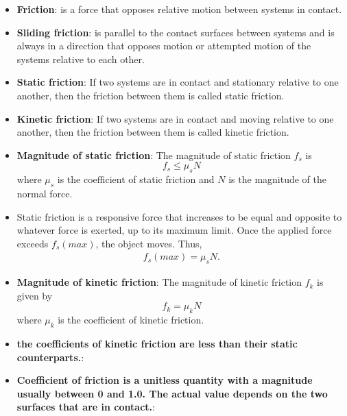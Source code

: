 \documentclass{report}
\begin{document}
\begin{itemize}
\begin{itemize}
                \end{itemize}
                \item \textbf{Friction}: is a force that opposes relative motion between systems in contact.
                \item \textbf{Sliding friction}: is parallel to the contact surfaces between systems and is always in a direction that opposes motion or attempted motion of the systems relative to each other. 
                \item \textbf{Static friction}: If two systems are in contact and stationary relative to one another, then the friction between them is called static friction. 
                \item \textbf{Kinetic friction}: If two systems are in contact and moving relative to one another, then the friction between them is called kinetic friction.
                \item \textbf{Magnitude of static friction}:
                    The magnitude of static friction $f_s$ is
                    \begin{equation}
                        f_s \leq \mu_s N
                    \end{equation}
                    where $\mu_s$ is the coefficient of static friction and $N$ is the magnitude of the normal force.
                \item  Static friction is a responsive force that increases to be equal and opposite to whatever force is exerted, up to its maximum limit. Once the applied force exceeds $f_{s}(max)$, the object moves. Thus,
                    \begin{align*}
                        f_{s}(max) = \mu_{s}N
                    .\end{align*}
                \item \textbf{Magnitude of kinetic friction}:
                    The magnitude of kinetic friction $f_k$ is given by
                    \begin{equation}
                        f_k = \mu_k N
                    \end{equation}
                    where $\mu_k$ is the coefficient of kinetic friction.
                \item \textbf{the coefficients of kinetic friction are less than their static counterparts.}:
                \item \textbf{Coefficient of friction is a unitless quantity with a magnitude usually between 0 and 1.0. The actual value depends on the two surfaces that are in contact.}:

\end{itemize}
\end{document}
